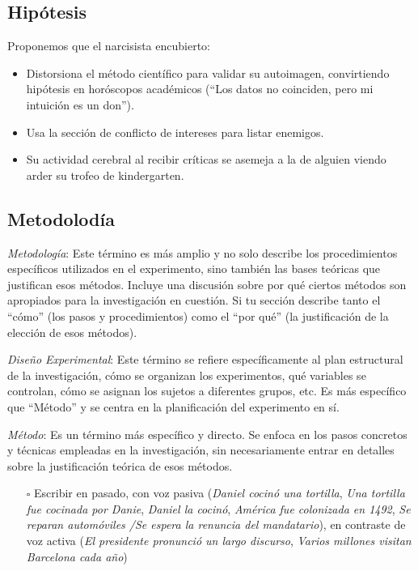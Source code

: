 \documentclass[
]{article}
\providecommand{\tightlist}{%
  \setlength{\itemsep}{0pt}\setlength{\parskip}{0pt}}\usepackage{longtable,booktabs,array}
\begin{document}
\subsection{Hipótesis}\label{hipuxf3tesis}

Proponemos que el narcisista encubierto:

\begin{itemize}
\tightlist
\item
  Distorsiona el método científico para validar su autoimagen,
  convirtiendo hipótesis en horóscopos académicos (``Los datos no
  coinciden, pero mi intuición es un don'').
\item
  Usa la sección de conflicto de intereses para listar enemigos.
\item
  Su actividad cerebral al recibir críticas se asemeja a la de alguien
  viendo arder su trofeo de kindergarten.
\end{itemize}

\subsection{Metodolodía}\label{metodoloduxeda}

\emph{Metodología}: Este término es más amplio y no solo describe los
procedimientos específicos utilizados en el experimento, sino también
las bases teóricas que justifican esos métodos. Incluye una discusión
sobre por qué ciertos métodos son apropiados para la investigación en
cuestión. Si tu sección describe tanto el ``cómo'' (los pasos y
procedimientos) como el ``por qué'' (la justificación de la elección de
esos métodos).

\emph{Diseño Experimental}: Este término se refiere específicamente al
plan estructural de la investigación, cómo se organizan los
experimentos, qué variables se controlan, cómo se asignan los sujetos a
diferentes grupos, etc. Es más específico que ``Método'' y se centra en
la planificación del experimento en sí.

\emph{Método}: Es un término más específico y directo. Se enfoca en los
pasos concretos y técnicas empleadas en la investigación, sin
necesariamente entrar en detalles sobre la justificación teórica de esos
métodos.

\begin{itemize}
\tightlist
\item[$\square$]
  Escribir en pasado, con voz pasiva (\emph{Daniel cocinó una tortilla},
  \emph{Una tortilla fue cocinada por Danie}, \emph{Daniel la cocinó},
  \emph{América fue colonizada en 1492}, \emph{Se reparan automóviles
  /Se espera la renuncia del mandatario}), en contraste de voz activa
  (\emph{El presidente pronunció un largo discurso}, \emph{Varios
  millones visitan Barcelona cada año})
\end{itemize}
\end{document}
